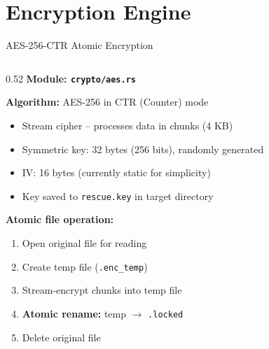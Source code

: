 \documentclass[aspectratio=169]{beamer}
\newcommand{\code}[1]{\texttt{\textcolor{primaryblue}{#1}}}
\begin{document}
\section{Encryption Engine}

\begin{frame}[fragile]{AES-256-CTR Atomic Encryption}
  \begin{columns}[T]
    \begin{column}{0.52\textwidth}
      \textbf{Module: \code{crypto/aes.rs}}

      \vspace{0.5em}
      \textbf{Algorithm:} AES-256 in CTR (Counter) mode
      \begin{itemize}
        \item Stream cipher -- processes data in chunks (4 KB)
        \item Symmetric key: 32 bytes (256 bits), randomly generated
        \item IV: 16 bytes (currently static for simplicity)
        \item Key saved to \code{rescue.key} in target directory
      \end{itemize}

      \vspace{0.5em}
      \textbf{Atomic file operation:}
      \begin{enumerate}
        \item Open original file for reading
        \item Create temp file (\code{.enc\_temp})
        \item Stream-encrypt chunks into temp file
        \item \textbf{Atomic rename:} temp $\rightarrow$ \code{.locked}
        \item Delete original file
      \end{enumerate}


\end{column}
\end{columns}
\end{frame}
\end{document}
